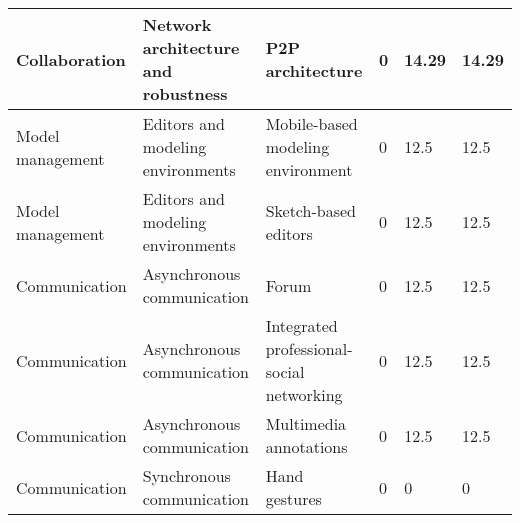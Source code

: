 \begin{table*}[]
\begin{tabular}{|l|l|l|l|l|l|}
Collaboration & Network architecture and robustness & P2P architecture & 0 & 14.29 & 14.29 \\ \hline 
Model management & Editors and modeling environments & Mobile-based modeling environment & 0 & 12.5 & 12.5 \\ \hline 
Model management & Editors and modeling environments & Sketch-based editors & 0 & 12.5 & 12.5 \\ \hline 
Communication & Asynchronous communication & Forum & 0 & 12.5 & 12.5 \\ \hline 
Communication & Asynchronous communication & Integrated professional-social networking & 0 & 12.5 & 12.5 \\ \hline 
Communication & Asynchronous communication & Multimedia annotations & 0 & 12.5 & 12.5 \\ \hline 
Communication & Synchronous communication & Hand gestures & 0 & 0 & 0 \\ \hline 
\end{tabular}%
  \end{table*}